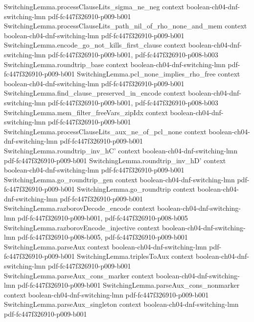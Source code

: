 \begin{theorem}
\proofstep
  {SwitchingLemma.processClauseLits_sigma_ne_neg}
  {context}
  {boolean-ch04-dnf-switching-lmn}
  {pdf-fc447f326910-p009-b001}
\proofstep
  {SwitchingLemma.processClauseLits_path_nil_of_rho_none_and_mem}
  {context}
  {boolean-ch04-dnf-switching-lmn}
  {pdf-fc447f326910-p009-b001}
\proofstep
  {SwitchingLemma.encode_go_not_kills_first_clause}
  {context}
  {boolean-ch04-dnf-switching-lmn}
  {pdf-fc447f326910-p009-b001,
    pdf-fc447f326910-p008-b003}
\proofstep
  {SwitchingLemma.roundtrip_base}
  {context}
  {boolean-ch04-dnf-switching-lmn}
  {pdf-fc447f326910-p009-b001}
\proofstep
  {SwitchingLemma.pcl_none_implies_rho_free}
  {context}
  {boolean-ch04-dnf-switching-lmn}
  {pdf-fc447f326910-p009-b001}
\proofstep
  {SwitchingLemma.find_clause_preserved_in_encode}
  {context}
  {boolean-ch04-dnf-switching-lmn}
  {pdf-fc447f326910-p009-b001,
    pdf-fc447f326910-p008-b003}
\proofstep
  {SwitchingLemma.mem_filter_freeVars_zipIdx}
  {context}
  {boolean-ch04-dnf-switching-lmn}
  {pdf-fc447f326910-p009-b001}
\proofstep
  {SwitchingLemma.processClauseLits_aux_ne_of_pcl_none}
  {context}
  {boolean-ch04-dnf-switching-lmn}
  {pdf-fc447f326910-p009-b001}
\proofstep
  {SwitchingLemma.roundtrip_inv_hC'}
  {context}
  {boolean-ch04-dnf-switching-lmn}
  {pdf-fc447f326910-p009-b001}
\proofstep
  {SwitchingLemma.roundtrip_inv_hD'}
  {context}
  {boolean-ch04-dnf-switching-lmn}
  {pdf-fc447f326910-p009-b001}
\proofstep
  {SwitchingLemma.go_roundtrip_gen}
  {context}
  {boolean-ch04-dnf-switching-lmn}
  {pdf-fc447f326910-p009-b001}
\proofstep
  {SwitchingLemma.go_roundtrip}
  {context}
  {boolean-ch04-dnf-switching-lmn}
  {pdf-fc447f326910-p009-b001}
\proofstep
  {SwitchingLemma.razborovDecode_encode}
  {context}
  {boolean-ch04-dnf-switching-lmn}
  {pdf-fc447f326910-p009-b001,
    pdf-fc447f326910-p008-b005}
\proofstep
  {SwitchingLemma.razborovEncode_injective}
  {context}
  {boolean-ch04-dnf-switching-lmn}
  {pdf-fc447f326910-p008-b005,
    pdf-fc447f326910-p009-b001}
\proofstep
  {SwitchingLemma.parseAux}
  {context}
  {boolean-ch04-dnf-switching-lmn}
  {pdf-fc447f326910-p009-b001}
\proofstep
  {SwitchingLemma.triplesToAux}
  {context}
  {boolean-ch04-dnf-switching-lmn}
  {pdf-fc447f326910-p009-b001}
\proofstep
  {SwitchingLemma.parseAux_cons_marker}
  {context}
  {boolean-ch04-dnf-switching-lmn}
  {pdf-fc447f326910-p009-b001}
\proofstep
  {SwitchingLemma.parseAux_cons_nonmarker}
  {context}
  {boolean-ch04-dnf-switching-lmn}
  {pdf-fc447f326910-p009-b001}
\proofstep
  {SwitchingLemma.parseAux_singleton}
  {context}
  {boolean-ch04-dnf-switching-lmn}
  {pdf-fc447f326910-p009-b001}

\end{theorem}
